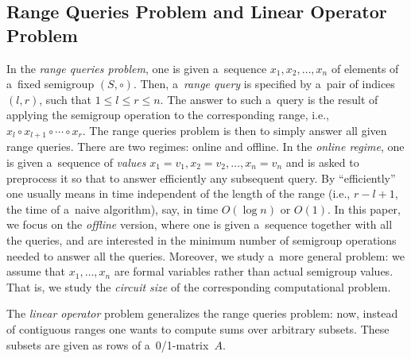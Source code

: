 \documentclass[a4paper,UKenglish,cleveref, autoref]{lipics-v2019}
\begin{document}
\subsection{Range Queries Problem and Linear Operator Problem}
In the {\em range queries problem}, one is given
a~sequence $x_1, x_2, \dotsc, x_n$ of
elements of a~fixed semigroup $(S, \circ)$.
Then, a~\emph{range query} is
specified by a~pair of indices $(l,r)$, such that $1 \le l \le r \le n$.
The answer to such a~query is the result of applying the semigroup
operation to the
corresponding range, i.e., $x_l \circ x_{l+1} \circ \dotsb \circ x_r$.
The range queries problem is then to simply answer all given range
queries.
There are two
regimes: online and offline. In the {\em online regime}, one is given
a~sequence of {\em values}
$x_1=v_1, x_2=v_2, \dotsc, x_n=v_n$ and is asked to preprocess
it so that to
answer efficiently any subsequent query.
By ``efficiently'' one usually
means in time independent of the length of the range
(i.e., $r-l+1$, the time
of a~naive algorithm), say, in time $O(\log n)$ or $O(1)$.
In this paper, we
focus on the {\em offline} version, where one is given a~sequence
together with
all the queries, and are interested in the minimum number of
semigroup
operations needed to answer all the queries. Moreover, we study
a~more general
problem: we assume that $x_1, \dotsc, x_n$ are formal variables
rather than
actual semigroup values. That is, we study the {\em circuit size} of
the corresponding
computational problem.

The {\em linear operator} problem generalizes the range
queries problem: now, instead of contiguous ranges one wants
to compute sums over arbitrary subsets. These subsets are
given as rows of a~0/1-matrix~$A$.
\end{document}
